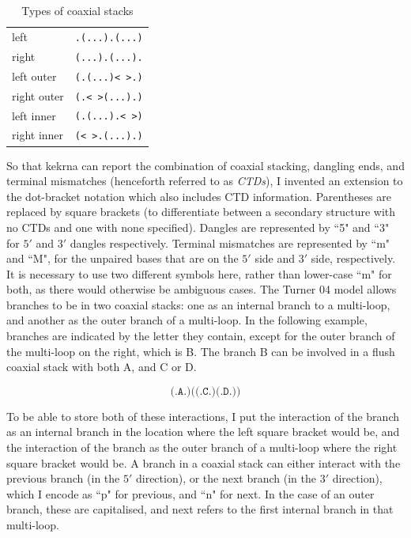 \documentclass{cshonours}
\begin{document}
\begin{table}
\begin{adjustbox}{center}
\begin{tabular}{ll}
left & \texttt{.(...).(...)} \\
right & \texttt{(...).(...).} \\
left outer & \texttt{(.(...)<   >.)} \\
right outer & \texttt{(.<   >(...).)} \\
left inner & \texttt{(.(...).<   >)} \\
right inner & \texttt{(<   >.(...).)} \\
\end{tabular}
\end{adjustbox}
\caption{Types of coaxial stacks}
\label{table:coax_types}
\end{table}

So that kekrna can report the combination of coaxial stacking, dangling ends, and terminal mismatches (henceforth referred to as \emph{CTDs}), I invented an extension to the dot-bracket notation which also includes CTD information. Parentheses are replaced by square brackets (to differentiate between a secondary structure with no CTDs and one with none specified). Dangles are represented by ``5" and ``3" for $5'$ and $3'$ dangles respectively. Terminal mismatches are represented by ``m" and ``M", for the unpaired bases that are on the $5'$ side and $3'$ side, respectively. It is necessary to use two different symbols here, rather than lower-case ``m" for both, as there would otherwise be ambiguous cases. The Turner 04 model allows branches to be in two coaxial stacks: one as an internal branch to a multi-loop, and another as the outer branch of a multi-loop. In the following example, branches are indicated by the letter they contain, except for the outer branch of the multi-loop on the right, which is B. The branch B can be involved in a flush coaxial stack with both A, and C or D. 

$$\texttt{(.A.)((.C.)(.D.))}$$

To be able to store both of these interactions, I put the interaction of the branch as an internal branch in the location where the left square bracket would be, and the interaction of the branch as the outer branch of a multi-loop where the right square bracket would be. A branch in a coaxial stack can either interact with the previous branch (in the $5'$ direction), or the next branch (in the $3'$ direction), which I encode as ``p" for previous, and ``n" for next. In the case of an outer branch, these are capitalised, and next refers to the first internal branch in that multi-loop.
\end{document}

